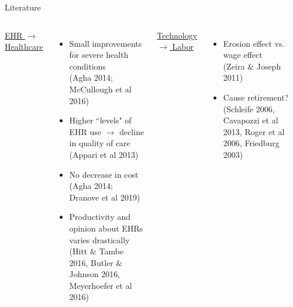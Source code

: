 \documentclass[10pt]{beamer}
\begin{document}
\begin{frame}{Literature}
\footnotesize 
\begin{columns}
        \centering
        \underline{ EHR $\rightarrow$ Healthcare }
        \begin{itemize}
            \item Small improvements for severe health conditions \\ \vspace{1mm}
            \tiny(Agha 2014; McCullough et al 2016)
            
            \footnotesize
            
            \item Higher ``levels" of EHR use $\rightarrow$ decline in quality of care\\ \vspace{1mm}
            \tiny (Appari et al 2013)
            
            \footnotesize 
            
            \item No decrease in cost \\ \vspace{1mm}
            \tiny (Agha 2014; Dranove et al 2019) 
            
            \footnotesize
            
            \item Productivity and opinion about EHRs varies drastically \\ \vspace{1mm}
            \tiny (Hitt $\&$ Tambe 2016, Butler $\&$ Johnson 2016, Meyerhoefer et al 2016)
            
        \end{itemize}

    \color{gray}
        \centering
        \underline{ Technology $\rightarrow$ Labor }
        \begin{itemize}
        \color{gray}
            \item Erosion effect vs. wage effect \\ \vspace{1mm}
            \tiny (Zeira $\&$ Joseph 2011)
            
            \footnotesize
            
            \item Cause retirement? \\ \vspace{1mm}
            \tiny (Schleife 2006, Cavapozzi et al 2013, Roger et al 2006, Friedburg 2003)
            

\end{itemize}
\end{columns}
\end{frame}
\end{document}
